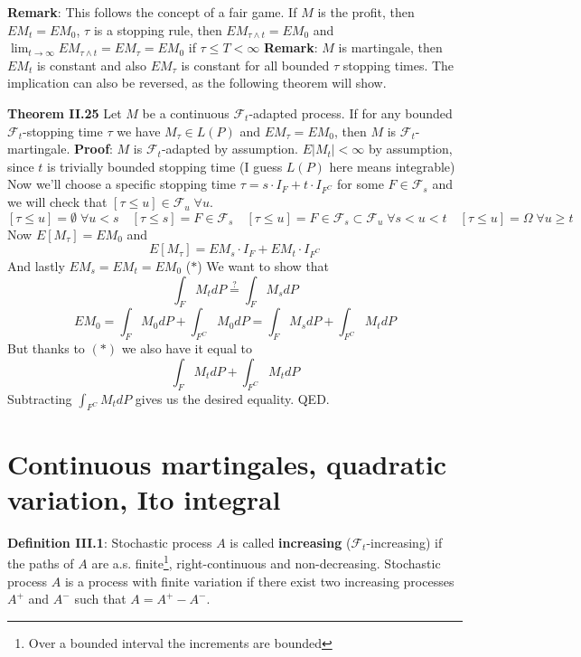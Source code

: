 \documentclass[english]{article}
\newcommand{\note}[1]{\noindent\textbf{#1}}
\newcommand{\F}{\mathcal F}
\begin{document}
\note{Remark}: This follows the concept of a fair game. If $M$ is the profit, then $EM_t = EM_0$, $\tau$ is a stopping rule, then $EM_{\tau \wedge t} = EM_0$ and $\lim_{t\to\infty} EM_{\tau \wedge t} = EM_\tau = EM_0$ if $\tau \leq T < \infty$ \newline
\note{Remark}: $M$ is martingale, then $EM_t$ is constant and also $EM_\tau$ is constant for all bounded $\tau$ stopping times. The implication can also be reversed, as the following theorem will show. \newline

\note{Theorem II.25} Let $M$ be a continuous $\F_t$-adapted process. If for any bounded $\F_t$-stopping time $\tau$ we have $M_\tau \in L(P)$ and $EM_\tau = EM_0$, then $M$ is $\F_t$-martingale. \newline
\note{Proof}: $M$ is $\F_t$-adapted by assumption. \newline
$E|M_t| < \infty$ by assumption, since $t$ is trivially bounded stopping time (I guess $L(P)$ here means integrable) \newline
Now we'll choose a specific stopping time $\tau = s \cdot I_F + t \cdot I_{F^C}$ for some $F \in \F_s$ and we will check that $[\tau \leq u] \in \F_u \; \forall u$.
$$[\tau \leq u] = \emptyset \; \forall u<s \quad [\tau\leq s] = F \in \F_s \quad [\tau \leq u] = F \in \F_s \subset \F_u \; \forall s < u < t \quad [\tau \leq u] = \Omega \; \forall u\geq t$$
Now $E[M_\tau] = EM_0$ and 
$$E[M_\tau] = EM_s \cdot I_F + EM_t \cdot I_{F^C}$$
And lastly $EM_s = EM_t = EM_0$ ($\ast$) \newline
We want to show that 
$$\int_F M_t dP \stackrel ?= \int_F M_s dP$$
$$EM_0 = \int_F M_0 dP + \int_{F^C} M_0 dP = \int_F M_s dP + \int_{F^C} M_t dP$$
But thanks to $(\ast)$ we also have it equal to
$$\int_F M_t dP + \int_{F^C} M_t dP$$
Subtracting $\int_{F^C} M_t dP$ gives us the desired equality. \newline
QED.

\section{Continuous martingales, quadratic variation, Ito integral}
\note{Definition III.1}: Stochastic process $A$ is called \textbf{increasing} ($\F_t$-increasing) if the paths of $A$ are a.s. finite\footnote{Over a bounded interval the increments are bounded}, right-continuous and non-decreasing. \newline
Stochastic process $A$ is a process with finite variation if there exist two increasing processes $A^+$ and $A^-$ such that $A= A^+ - A^-$. \newline
\end{document}
